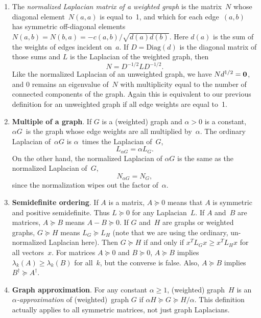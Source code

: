 \documentclass[11pt]{article}
\newcommand{\m}[1]{{\bf{#1}}}       %
\newcommand{\zeros}{\m0}            %
\newcommand{\Diag}{\mbox{Diag}}
\newcommand{\pinv}{^{\dagger}}                  %
\begin{document}
\begin{enumerate}
\item\label{wnorm}
The {\em normalized Laplacian matrix of a weighted graph}
is the matrix~$N$
whose diagonal element~$N(a,a)$ is equal to~1,
and which for each edge~$(a,b)$ has symmetric off-diagonal elements 
$N(a,b) = N(b,a) = -c(a,b)/\sqrt{d(a)d(b)}$.
Here $d(a)$ is the sum of the weights of edges incident on~$a$.
If $D = \Diag(d)$ is the diagonal matrix of those sums
and $L$ is the Laplacian of the weighted graph, then
$$N = D^{-1/2}LD^{-1/2}.$$
Like the normalized Laplacian of an unweighted graph, 
we have $Nd^{1/2}=\zeros$, 
and 0 remains an eigenvalue of~$N$ with multiplicity equal to the 
number of connected components of the graph.
Again this is equivalent to our previous definition for an unweighted graph
if all edge weights are equal to~1.

\item {\bf Multiple of a graph}.
If $G$ is a (weighted) graph and $\alpha>0$ is a constant, $\alpha G$~is the
graph whose edge weights are all multiplied by~$\alpha$.
The ordinary Laplacian of~$\alpha G$ is $\alpha$~times the Laplacian of~$G$,
$$L_{\alpha G} = \alpha L_G.$$ 
On the other hand, the normalized Laplacian of $\alpha G$ is the same as the
normalized Laplacian of~$G$, 
$$N_{\alpha G} = N_G,$$ 
since the normalization wipes out the factor of~$\alpha$.

\item {\bf Semidefinite ordering}.
If $A$ is a matrix, $A\succeq0$ means that $A$ is symmetric and positive semidefinite.
Thus $L\succeq 0$ for any Laplacian~$L$.
If $A$ and~$B$ are matrices, $A\succeq B$ means $A-B\succeq 0$.
If $G$ and~$H$ are graphs or weighted graphs, $G\succeq H$ means $L_G\succeq L_H$
(note that we are using the ordinary, un-normalized Laplacian here).
Then $G\succeq H$ if and only if $x^TL_Gx \geq x^TL_Hx$ for all vectors~$x$.
For matrices $A \succeq 0$ and $B \succeq 0$,
$A\succeq B$ implies $\lambda_k(A) \geq \lambda_k(B)$ for all~$k$,
but the converse is false.
Also, $A \succeq B$ implies $B\pinv \succeq A\pinv$.

\item {\bf Graph approximation}.
For any constant $\alpha\geq 1$, (weighted) graph~$H$ is an {\em $\alpha$-approximation} 
of (weighted)~graph $G$ if $\alpha H \succeq G \succeq H/\alpha$.
This definition actually applies to all symmetric matrices, not just graph Laplacians.

\end{enumerate}
\end{document}
